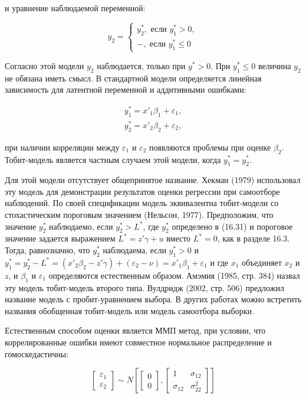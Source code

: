 и уравнение наблюдаемой переменной:

\begin{equation}
y_2=
\begin{cases}
y_2^{*}, \text{ если } y_1^{*}>0, \\
-, \text{ если }y_1^{*} \leq 0
\end{cases}
\end{equation}

Согласно этой модели $y_2$ наблюдается, только при $y^* >0$. При $y^* _{1} \leq 0$ величина $y_2$ не обязана иметь смысл. В стандартной модели определяется линейная зависимость для латентной переменной и аддитивными ошибками:

\begin{equation}
\begin{array}{l}
y_1^{*}=x'_{1}\beta_1+\varepsilon_1, \\
y_2^{*}=x'_{2}\beta_2+\varepsilon_{2},
\end{array}
\end{equation}

при наличии корреляции между $\varepsilon_1$ и $\varepsilon_2$ появляются проблемы при оценке $\beta_2$. Тобит-модель является частным случаем этой модели, когда $y^* _1=y^* _2$.

Для этой модели отсутствует общепринятое название. Хекман (1979) использовал эту модель для демонстрации результатов оценки регрессии при самоотборе наблюдений. 
По своей спецификации модель эквивалентна тобит-модели со стохастическим пороговым значением (Нельсон, 1977). 
Предположим, что значение $y^* _2$ наблюдаемо, если $y^* _{2}>L^{*}$, где $y^* _2$ определено в (16.31) и пороговое значение задается выражением $L^{*}=z'\gamma+u$ вместо $L^{*}=0$, как в разделе 16.3. Тогда, равнозначно, что $y^* _2$ наблюдаема, если $y^* _1>0$ и $y^* _{1}=y^* _{2}-L^{*}=(x'_2\beta_{2}-z'\gamma)+(\varepsilon_2-\nu)=x'_{1}\beta_{1}+\varepsilon_1$ и где $x_1$ объединяет $x_2$ и $z$, и $\beta_1$ и $\varepsilon_1$ определяются естественным образом. Амэмия (1985, стр. 384) назвал эту модель тобит-модель второго типа. Вулдридж (2002, стр. 506) предложил название модель с пробит-уравнением выбора. В других работах можно встретить названия обобщенная тобит-модель или модель самоотбора выборки.

Естественным способом оценки является ММП метод, при условии, что коррелированные ошибки имеют совместное нормальное распределение и гомоскедастичны:

\begin{equation}
\begin{bmatrix}
\varepsilon_1\\ \varepsilon_2
\end{bmatrix}
\sim
N
\left[
\begin{bmatrix}
0 \\ 0
\end{bmatrix},
\begin{bmatrix}
1 &\sigma_{12} \\ \sigma_{12}&\sigma_{22}^2
\end{bmatrix}
\right]
\end{equation}

